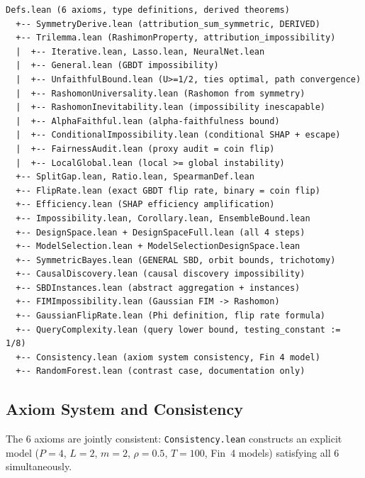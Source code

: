 \documentclass{article}
\begin{document}
{\small\begin{verbatim}
Defs.lean (6 axioms, type definitions, derived theorems)
  +-- SymmetryDerive.lean (attribution_sum_symmetric, DERIVED)
  +-- Trilemma.lean (RashimonProperty, attribution_impossibility)
  |  +-- Iterative.lean, Lasso.lean, NeuralNet.lean
  |  +-- General.lean (GBDT impossibility)
  |  +-- UnfaithfulBound.lean (U>=1/2, ties optimal, path convergence)
  |  +-- RashomonUniversality.lean (Rashomon from symmetry)
  |  +-- RashomonInevitability.lean (impossibility inescapable)
  |  +-- AlphaFaithful.lean (alpha-faithfulness bound)
  |  +-- ConditionalImpossibility.lean (conditional SHAP + escape)
  |  +-- FairnessAudit.lean (proxy audit = coin flip)
  |  +-- LocalGlobal.lean (local >= global instability)
  +-- SplitGap.lean, Ratio.lean, SpearmanDef.lean
  +-- FlipRate.lean (exact GBDT flip rate, binary = coin flip)
  +-- Efficiency.lean (SHAP efficiency amplification)
  +-- Impossibility.lean, Corollary.lean, EnsembleBound.lean
  +-- DesignSpace.lean + DesignSpaceFull.lean (all 4 steps)
  +-- ModelSelection.lean + ModelSelectionDesignSpace.lean
  +-- SymmetricBayes.lean (GENERAL SBD, orbit bounds, trichotomy)
  +-- CausalDiscovery.lean (causal discovery impossibility)
  +-- SBDInstances.lean (abstract aggregation + instances)
  +-- FIMImpossibility.lean (Gaussian FIM -> Rashomon)
  +-- GaussianFlipRate.lean (Phi definition, flip rate formula)
  +-- QueryComplexity.lean (query lower bound, testing_constant := 1/8)
  +-- Consistency.lean (axiom system consistency, Fin 4 model)
  +-- RandomForest.lean (contrast case, documentation only)
\end{verbatim}}

\subsection{Axiom System and Consistency}

The 6 axioms are jointly consistent: \texttt{Consistency.lean} constructs an explicit model ($P{=}4$, $L{=}2$, $m{=}2$, $\rho{=}0.5$, $T{=}100$, Fin~4 models) satisfying all 6 simultaneously.
\end{document}
